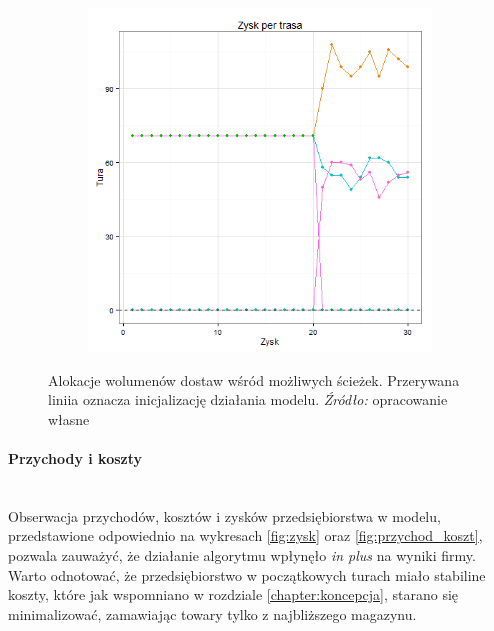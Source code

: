 \documentclass[polish, twoside, 12pt, a4paper]{article}
\theoremstyle{definition}
\theoremstyle{plain}
\theoremstyle{remark}
\begin{document}
\begin{figure}[hbt]
  \centering

  \begin{subfigure}[t]{0.45\textwidth}
    \includegraphics[width=\textwidth]{pictures/trasy.png}
  \end{subfigure}

  \captionsetup{margin=10pt,font=small,labelfont=bf,width=.8\textwidth}

  \caption[Alokacje wolumenów dostaw wśród możliwych ścieżek]{Alokacje wolumenów dostaw wśród możliwych ścieżek. Przerywana liniia oznacza inicjalizację działania modelu. \textit{Źródło:} opracowanie własne}\label{fig:sciezki}
\end{figure}


\paragraph{Przychody i koszty} \mbox{}\\

Obserwacja przychodów, kosztów i zysków przedsiębiorstwa w modelu, przedstawione odpowiednio na wykresach \ref{fig:zysk} oraz \ref{fig:przychod_koszt}, pozwala zauważyć, że działanie algorytmu wpłynęło \textit{in plus} na wyniki firmy. Warto odnotować, że przedsiębiorstwo w początkowych turach miało stabiline koszty, które jak wspomniano w rozdziale \ref{chapter:koncepcja}, starano się minimalizować, zamawiając towary tylko z najbliższego magazynu. 
\end{document}
